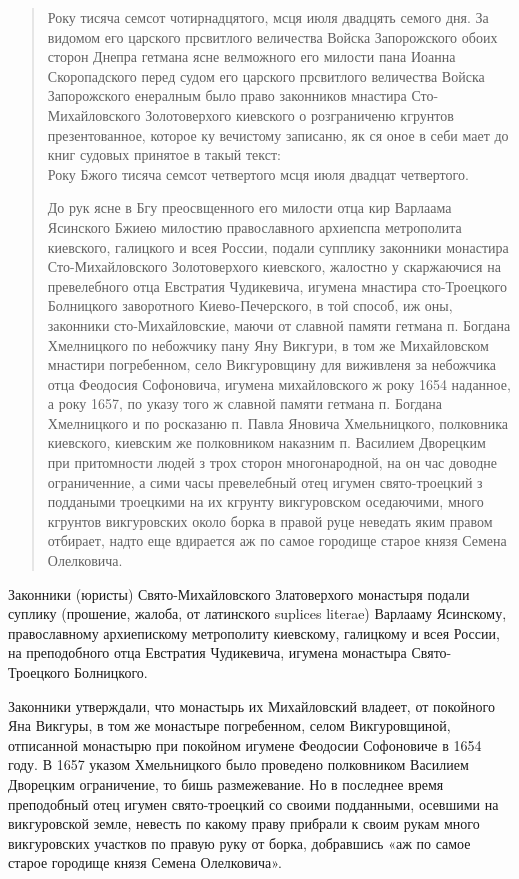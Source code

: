 \begin{quotation}
Року тисяча семсот чотирнадцятого, мсця июля двадцять семого дня. За видомом его царского прсвитлого величества Войска Запорожского обоих сторон Днепра гетмана ясне велможного его милости пана Иоанна Скоропадского перед судом его царского прсвитлого величества Войска
Запорожского енералным было право законников мнастира Сто-Михайловс\-кого Золотоверхого киевского о розграниченю кгрунтов презентованное, которое ку вечистому записаню, як ся оное в себи мает до книг судовых принятое в такый текст:\\

Року Бжого тисяча семсот четвертого мсця июля двадцат четвертого.

До рук ясне в Бгу преосвщенного его милости отца кир Варлаама Ясинского Бжиею милостию православного архиепспа метрополита киевского, галицкого и всея России, подали супплику законники монастира Сто-Михайловс\-кого Золотоверхого киевского, жалостно у скар\-жаючися на превелебного отца Евстратия Чудикевича, игумена мнастира сто-Троецкого Болницкого заворотного Киево-Печерско\-го, в той способ, иж оны, законники сто-Михайловские, маючи от славной памяти гетмана п. Богдана Хмелницкого по небожчику пану Яну Викгури, в том же Михайловском мнастири погребенном, село Викгуровщину для виживленя за небожчика отца Феодосия Софоновича, игумена михайловского ж року 1654 наданное, а року 1657, по указу того ж славной памяти гетмана п. Богдана Хмелницкого и по росказаню п. Павла Яновича Хмельницкого, полковника киевского, киевским же полковником наказним п. Василием Дворецким при притомности людей з трох сторон многонародной, на он час доводне ограниченние, а сими часы превелебный отец игумен свято-троецкий з поддаными троецкими на их кгрунту викгуровском оседаючими, много кгрунтов викгуровских около борка в правой руце неведать яким правом отбирает, надто еще вдирается аж по самое городище старое князя Семена Олелковича.
\end{quotation}

Законники (юристы) Свято-Михайловского Златоверхого монастыря подали суплику (прошение, жалоба, от латинского suplices literae) Варлааму Ясинскому, православному архиепискому метрополиту киевскому, галицкому и всея России, на  преподобного отца Евстратия Чудикевича, игумена монастыра Свято-Троецкого Болницкого.

Законники утверждали, что монастырь их Михайловский владеет, от покойного Яна Викгуры, в том же монастыре погребенном, селом Викгуровщиной, отписанной монастырю при покойном игумене Феодосии Софоновиче в 1654 году. В 1657 указом Хмельницкого было проведено полковником Василием Дворецким ограничение, то бишь размежевание. Но в последнее время преподобный отец игумен свято-троецкий со своими подданными, осевшими на викгуровской земле, невесть по какому праву прибрали к своим рукам много викгуровских участков по правую руку от борка, добравшись «аж по самое старое городище князя Семена Олелковича».

